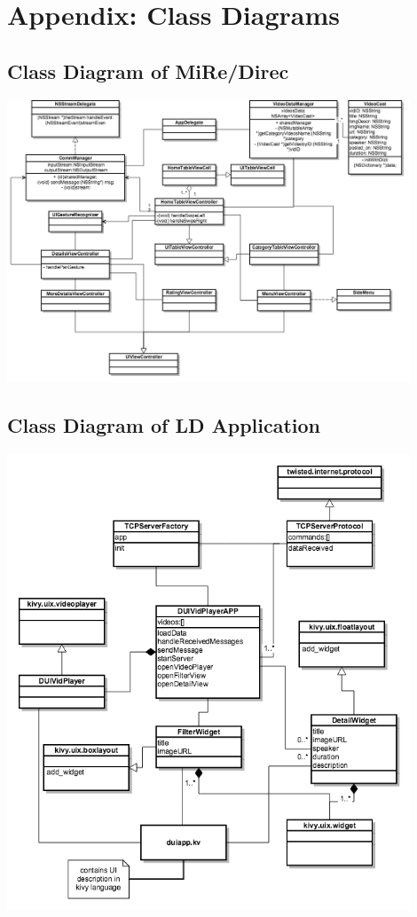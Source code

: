 \chapter{Appendix: Class Diagrams}\label{chapter:appendA}
\section{Class Diagram of MiRe/Direc}
\includegraphics[width=0.9\textwidth, center, center]{figures/class_diagramSD}
\newpage
\section{Class Diagram of LD Application}
\includegraphics[width=0.9\textwidth, center, center]{figures/class_diagramLD}
